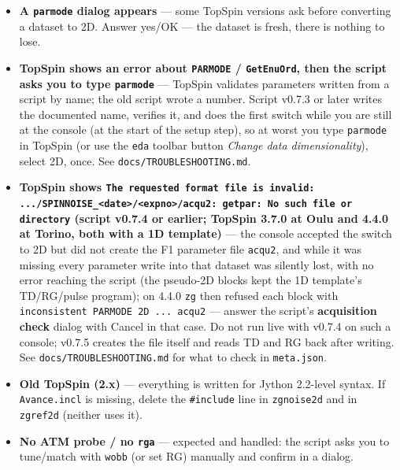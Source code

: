 \documentclass[11pt]{article}
\newcommand{\ts}{TopSpin}
\newcommand{\file}[1]{\texttt{#1}}
\newcommand{\dialog}[1]{\textbf{#1}}
\begin{document}
\begin{itemize}
      origin; \texttt{rga} still returned the gain that keeps the
      pulse-free rows clear of full scale. v0.7.7's \file{zgnoise2d}
      defines \texttt{acqt0=0}, Bruker's own idiom for a pulse-free
      acquisition, and the warning is gone.
\item \textbf{A \texttt{parmode} dialog appears} --- some \ts{} versions ask
      before converting a dataset to 2D. Answer yes/OK --- the dataset is
      fresh, there is nothing to lose.
\item \textbf{\ts{} shows an error about \texttt{PARMODE} / \texttt{GetEnuOrd},
      then the script asks you to type \texttt{parmode}} --- \ts{} validates
      parameters written from a script by name; the old script wrote a
      number. Script v0.7.3 or later writes the documented name, verifies it,
      and does the first switch while you are still at the console (at the
      start of the setup step), so at worst you type \texttt{parmode} in
      \ts{} (or use the \texttt{eda} toolbar button \emph{Change data
      dimensionality}), select 2D, once. See \file{docs/TROUBLESHOOTING.md}.
\item \textbf{\ts{} shows \texttt{The requested format file is invalid:
      .../SPINNOISE\_<date>/<expno>/acqu2: getpar: No such file or
      directory} (script v0.7.4 or earlier; \ts{} 3.7.0 at Oulu and 4.4.0 at
      Torino, both with a 1D template)} --- the console accepted the switch
      to 2D but did not create the F1 parameter file \file{acqu2}, and while
      it was missing every parameter write into that dataset was silently
      lost, with no error reaching the script (the pseudo-2D blocks kept the
      1D template's TD/RG/pulse program); on 4.4.0 \texttt{zg} then refused
      each block with \texttt{inconsistent PARMODE 2D ... acqu2} --- answer
      the script's \dialog{acquisition check} dialog with Cancel in that
      case. Do not run live with v0.7.4 on such a console; v0.7.5 creates
      the file itself and reads TD and RG back after writing. See
      \file{docs/TROUBLESHOOTING.md} for what to check in \file{meta.json}.
\item \textbf{Old \ts{} (2.x)} --- everything is written for Jython 2.2-level
      syntax. If \file{Avance.incl} is missing, delete the \texttt{\#include}
      line in \file{zgnoise2d} and in \file{zgref2d} (neither uses it).
\item \textbf{No ATM probe / no \texttt{rga}} --- expected and handled: the
      script asks you to tune/match with \texttt{wobb} (or set RG) manually
      and confirm in a dialog.

\end{itemize}
\end{document}
